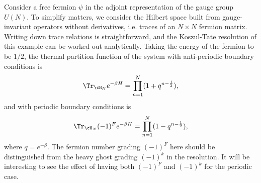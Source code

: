 \documentclass[a4paper,12pt]{article}
\begin{document}
Consider a free fermion $\psi$ in the adjoint representation of the gauge group $U(N)$. To simplify matters, we consider the Hilbert space built from gauge-invariant operators without derivatives, i.e. traces of an $N \times N$ fermion matrix. Writing down trace relations is straightforward, and the Koszul-Tate resolution of this example can be worked out analytically. Taking the energy of the fermion to be $1/2$, the thermal partition function of the system with anti-periodic boundary conditions is
\begin{equation}
\Tr_{\cH_N} e^{-\beta H} = \prod_{n=1}^N (1 + q^{n-\frac{1}{2}}),
\end{equation}
and with periodic boundary conditions is
\begin{equation}
\Tr_{\cH_N} (-1)^F e^{-\beta H} = \prod_{n=1}^N (1 - q^{n-\frac{1}{2}}),
\end{equation}
where $q = e^{-\beta}$. The fermion number grading $(-1)^F$ here should be distinguished from the heavy ghost grading $(-1)^k$ in the resolution. It will be interesting to see the effect of having both $(-1)^F$ and $(-1)^k$ for the periodic case.
\end{document}
